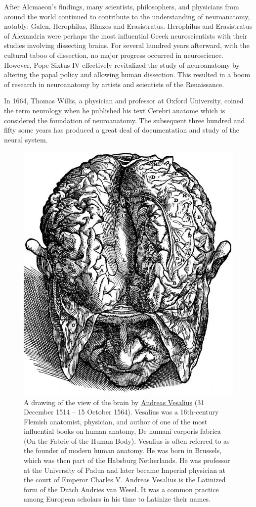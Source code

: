 After Alcmaeon's findings, many scientists, philosophers, and physicians from around the world continued to contribute to the understanding of neuroanatomy, notably: Galen, Herophilus, Rhazes and Erasistratus. Herophilus and Erasistratus of Alexandria were perhaps the most influential Greek neuroscientists with their studies involving dissecting brains. For several hundred years afterward, with the cultural taboo of dissection, no major progress occurred in neuroscience. However, Pope Sixtus IV effectively revitalized the study of neuroanatomy by altering the papal policy and allowing human dissection. This resulted in a boom of research in neuroanatomy by artists and scientists of the Renaissance.

In 1664, Thomas Willis, a physician and professor at Oxford University, coined the term neurology when he published his text Cerebri anatome which is considered the foundation of neuroanatomy. The subsequent three hundred and fifty some years has produced a great deal of documentation and study of the neural system.



\begin{figure}

{\centering \includegraphics[width=0.7\linewidth]{./figures/nervoussystem/braincase} 

}

\caption{A drawing of the view of the brain by \href{https://en.wikipedia.org/wiki/Andreas_Vesalius}{Andreas Vesalius} (31 December 1514 -- 15 October 1564). Vesalius was a 16th-century Flemish anatomist, physician, and author of one of the most influential books on human anatomy, De humani corporis fabrica (On the Fabric of the Human Body). Vesalius is often referred to as the founder of modern human anatomy. He was born in Brussels, which was then part of the Habsburg Netherlands. He was professor at the University of Padua and later became Imperial physician at the court of Emperor Charles V. Andreas Vesalius is the Latinized form of the Dutch Andries van Wesel. It was a common practice among European scholars in his time to Latinize their names.}\label{fig:braincase}
\end{figure}

